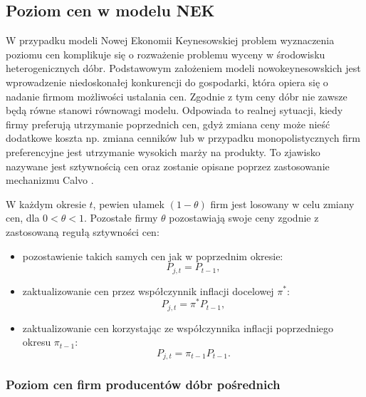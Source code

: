 \subsection{Poziom cen w modelu NEK}
\label{sec:nek_price_level}

W przypadku modeli Nowej Ekonomii Keynesowskiej problem wyznaczenia poziomu cen komplikuje się o rozważenie problemu wyceny w środowisku heterogenicznych dóbr. Podstawowym założeniem modeli nowokeynesowskich jest wprowadzenie niedoskonałej konkurencji do gospodarki, która opiera się o nadanie firmom możliwości ustalania cen. Zgodnie z tym ceny dóbr nie zawsze będą równe stanowi równowagi modelu. Odpowiada to realnej sytuacji, kiedy firmy preferują utrzymanie poprzednich cen, gdyż zmiana ceny może nieść dodatkowe koszta np. zmiana cenników lub w przypadku monopolistycznych firm preferencyjne jest utrzymanie wysokich marży na produkty. To zjawisko nazywane jest sztywnością cen oraz zostanie opisane poprzez zastosowanie mechanizmu Calvo \cite{CALVO1983383}.

\begin{definition}

W każdym okresie $t$, pewien ułamek $\left( 1 - \theta \right)$ firm  jest losowany w celu zmiany cen, dla $0 < \theta < 1$. Pozostałe firmy $\theta$ pozostawiają swoje ceny zgodnie z zastosowaną regułą sztywności cen:
\begin{itemize}
    \item pozostawienie takich samych cen jak w poprzednim okresie:
    \begin{equation}
        \label{eqn:calvo_first_rule}
        P_{j,t} = P_{t-1},
    \end{equation}
    \item zaktualizowanie cen przez współczynnik inflacji docelowej $\pi^*$:
    \begin{equation}
        P_{j,t} = \pi^* P_{t-1},
    \end{equation}
    \item zaktualizowanie cen korzystając ze współczynnika inflacji poprzedniego okresu $\pi_{t-1}$:
    \begin{equation}
        P_{j,t} = \pi_{t-1}P_{t-1}.    
    \end{equation}
\end{itemize}
\end{definition}

\subsubsection{Poziom cen firm producentów dóbr pośrednich}

